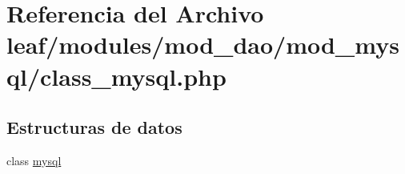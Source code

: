 \hypertarget{mod__dao_2mod__mysql_2class__mysql_8php}{\section{Referencia del Archivo leaf/modules/mod\-\_\-dao/mod\-\_\-mysql/class\-\_\-mysql.php}
\label{mod__dao_2mod__mysql_2class__mysql_8php}
}
\subsection*{Estructuras de datos}
\begin{DoxyCompactItemize}
\item 
class \hyperlink{classmysql}{mysql}
\end{DoxyCompactItemize}

